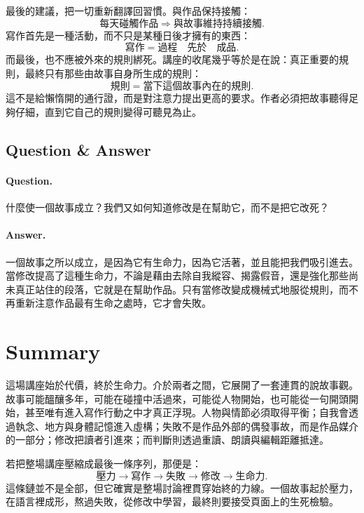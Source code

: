 最後的建議，把一切重新翻譯回習慣。與作品保持接觸：
\begin{equation}
\text{每天碰觸作品} \Rightarrow \text{與故事維持持續接觸}.
\end{equation}
寫作首先是一種活動，而不只是某種日後才擁有的東西：
\begin{equation}
\text{寫作} = \text{過程} \quad \text{先於} \quad \text{成品}.
\end{equation}
而最後，也不應被外來的規則綁死。講座的收尾幾乎等於是在說：真正重要的規則，最終只有那些由故事自身所生成的規則：
\begin{equation}
\text{規則} = \text{當下這個故事內在的規則}.
\end{equation}
這不是給懶惰開的通行證，而是對注意力提出更高的要求。作者必須把故事聽得足夠仔細，直到它自己的規則變得可聽見為止。

\subsection{Question \& Answer}

\paragraph{Question.} 什麼使一個故事成立？我們又如何知道修改是在幫助它，而不是把它改死？

\paragraph{Answer.} 一個故事之所以成立，是因為它有生命力，因為它活著，並且能把我們吸引進去。當修改提高了這種生命力，不論是藉由去除自我縱容、揭露假音，還是強化那些尚未真正站住的段落，它就是在幫助作品。只有當修改變成機械式地服從規則，而不再重新注意作品最有生命之處時，它才會失敗。

\section{Summary}

這場講座始於代價，終於生命力。介於兩者之間，它展開了一套連貫的說故事觀。故事可能醞釀多年，可能在碰撞中活過來，可能從人物開始，也可能從一句開頭開始，甚至唯有進入寫作行動之中才真正浮現。人物與情節必須取得平衡；自我會透過執念、地方與身體記憶進入虛構；失敗不是作品外部的偶發事故，而是作品媒介的一部分；修改把讀者引進來；而判斷則透過重讀、朗讀與編輯距離抵達。

若把整場講座壓縮成最後一條序列，那便是：
\begin{equation}
\text{壓力} \to \text{寫作} \to \text{失敗} \to \text{修改} \to \text{生命力}.
\end{equation}
這條鏈並不是全部，但它確實是整場討論裡貫穿始終的力線。一個故事起於壓力，在語言裡成形，熬過失敗，從修改中學習，最終則要接受頁面上的生死檢驗。